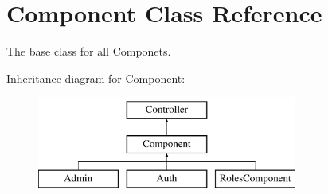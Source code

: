\hypertarget{class_component}{
\section{Component Class Reference}
\label{class_component}
}


The base class for all Componets.  


Inheritance diagram for Component:\begin{figure}[H]
\begin{center}
\leavevmode
\includegraphics[height=3.000000cm]{class_component}
\end{center}
\end{figure}
